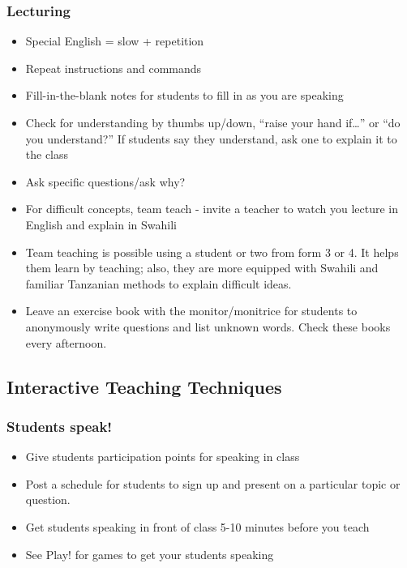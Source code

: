 \documentclass[12pt,a4paper]{report}
\begin{document}
\subsubsection{Lecturing}
\begin{itemize}

\item{Special English = slow + repetition}

\item{Repeat instructions and commands}

\item{Fill-in-the-blank notes for students to fill in as you are speaking}

\item{Check for understanding by thumbs up/down, “raise your hand if…” or “do you understand?” If students say they understand, ask one to explain it to the class}

\item{Ask specific questions/ask why?}

\item{For difficult concepts, team teach - invite a teacher to watch you lecture in English and explain in Swahili}

\item{Team teaching is possible using a student or two from form 3 or 4. It helps them learn by teaching; also, they are more equipped with Swahili and familiar Tanzanian methods to explain difficult ideas.}

\item{Leave an exercise book with the monitor/monitrice for students to anonymously write questions and list unknown words. Check these books every afternoon.}

\end{itemize}

\subsection{Interactive Teaching Techniques}

\subsubsection{Students speak!}
\begin{itemize}
\item{Give students participation points for speaking in class}

\item{Post a schedule for students to sign up and present on a particular topic or question.}

\item{Get students speaking in front of class 5-10 minutes before you teach}

\item{See Play! for games to get your students speaking}
\end{itemize}
\end{document}
